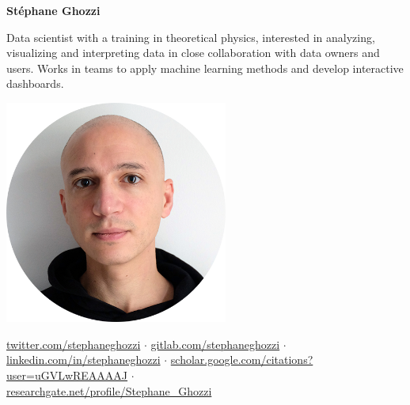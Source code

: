 \documentclass[a4paper,11pt,oneside]{article}
\begin{document}

\noindent\begin{minipage}{0.7\linewidth}
   \LARGE
   \noindent\textbf{Stéphane Ghozzi}

   \normalsize
   \vspace{1.5em}
   \noindent Data scientist with a training in theoretical physics, interested in analyzing, visualizing and interpreting data in close collaboration with data owners and users. Works in teams to apply machine learning methods and develop interactive dashboards. 
\end{minipage}
\begin{minipage}{0.3\linewidth}
   \begin{center}
      \includegraphics[width=0.55\textwidth,right]{GHOZZI-Stephane-portrait-2020-cropped-circle-nobackground-lr.png}
   \end{center}
\end{minipage} 

\vspace{1em}

\href{https://twitter.com/stephaneghozzi}{twitter.com/stephaneghozzi} $\cdot$ \href{https://gitlab.com/stephaneghozzi}{gitlab.com/stephaneghozzi} $\cdot$ \\ \href{https://www.linkedin.com/in/stephaneghozzi}{linkedin.com/in/stephaneghozzi} $\cdot$ \href{https://scholar.google.com/citations?user=uGVLwREAAAAJ}{scholar.google.com/citations?user=uGVLwREAAAAJ} $\cdot$ \\
\href{https://www.researchgate.net/profile/Stephane\_Ghozzi}{researchgate.net/profile/Stephane\_Ghozzi}

\vspace{1em}

\noindent {\color{gray}\hrule} 

\vspace{1em}
\end{document}
